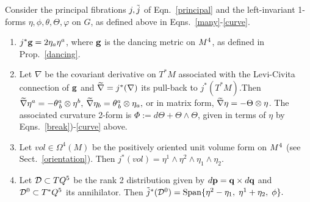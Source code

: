  

\begin{proposition}\label{all}    

Consider the principal  fibrations $j, {\tilde j}$ of Eqn.~\eqref{principal} and the left-invariant 1-forms $\eta, \phi, \theta, \Theta, \varphi$ on $G$, as defined above in Eqns.~\eqref{many}-\eqref{curve}. 

\begin{enumerate}[leftmargin=18pt,label=(\alph*)]\setlength\itemsep{5pt}
\item  $j^*\mathbf{ g}=2\eta_a\eta^a$, where $\mathbf{ g}$ is the dancing metric on $M^4$, as defined in Prop.~\ref{dancing}. 

\item Let $\nabla$ be the covariant derivative on $T^*M$ associated with   the Levi-Civita connection of   $\mathbf{ g}$ and $\widetilde\nabla=j^*(\nabla)$ its pull-back to $j^*(T^*M)$.Then $\widetilde\nabla\eta^a=-\theta^a_{\,b}\otimes\eta^b, $ $\widetilde\nabla\eta_b=\theta^a_{\,b}\otimes\eta_a,$ or in matrix form,
$\widetilde\nabla\eta=-\Theta\otimes\eta$. The associated  curvature 2-form   is $\Phi:=d\Theta+\Theta\wedge\Theta$,  given in terms of $\eta$ by   Eqns.~\eqref{break})-\eqref{curve} above. 


 
\item  Let $vol\in\Omega^4(M)$ be the positively oriented unit volume form on $M^4$ (see  Sect.~\ref{orientation}). Then  $j^*(vol)=\eta^1\wedge\eta^2\wedge\eta_1\wedge\eta_2.$ 


\item   Let  ${\mathcal D}\subset TQ^5$ be the rank 2 distribution given by $d{\mathbf p}=\mathbf q\times d\mathbf q$ and ${\mathcal D}^0\subset T^*Q^5$ its annihilator.  
Then   ${\tilde j}^*({\mathcal D}^0)=\mathrm{Span}\{\eta^2-\eta_1,\;\eta^1+\eta_2, \; \phi\}.$

\end{enumerate}
\end{proposition}

